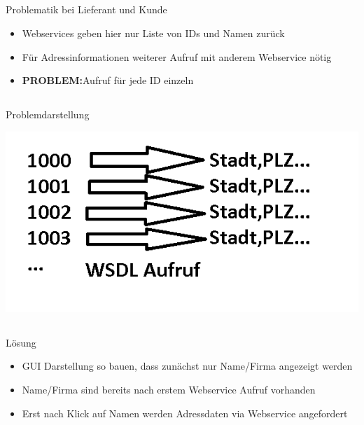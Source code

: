 \documentclass[xcolor={usenames,dvipsnames}, compress, 10pt]{beamer}
\begin{document}
\subsection*{}

\begin{frame}{Problematik bei Lieferant und Kunde}
\begin{center}

\begin{itemize}
\item Webservices geben hier nur Liste von IDs und Namen zurück
\item Für Adressinformationen weiterer Aufruf mit anderem Webservice nötig
\item \textbf{PROBLEM:}Aufruf für jede ID einzeln
\end{itemize}

\end{center}
\end{frame}

\subsection*{}

\begin{frame}{Problemdarstellung}
\begin{center}

\includegraphics[width=\textheight]{Bilder/presi1.png} 

\end{center}
\end{frame}

\subsection*{}

\begin{frame}{Lösung}
\begin{center}

\begin{itemize}
\item GUI Darstellung so bauen, dass zunächst nur Name/Firma angezeigt werden
\item Name/Firma sind bereits nach erstem Webservice Aufruf vorhanden
\item Erst nach Klick auf Namen werden Adressdaten via Webservice angefordert
\end{itemize}

\end{center}
\end{frame}
\end{document}
